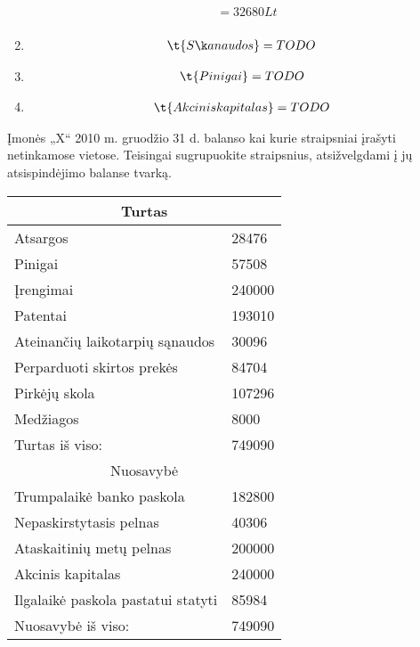 \begin{tasks}
\begin{task}
\begin{solution}
\begin{enumerate}
\begin{align*}
            &= 32680 Lt \\
          \end{align*}
        \item
          \begin{align*}
            \t{Sąnaudos}
            &= TODO \\
          \end{align*}
        \item
          \begin{align*}
            \t{Pinigai}
            &= TODO \\
          \end{align*}
        \item
          \begin{align*}
            \t{Akcinis kapitalas}
            &= TODO \\
          \end{align*}
      \end{enumerate}
    \end{solution}
  \end{task}

  \begin{task}
    \begin{condition}
      Įmonės „X“ 2010 m. gruodžio 31 d. balanso kai kurie straipsniai
      įrašyti netinkamose vietose. Teisingai sugrupuokite straipsnius,
      atsižvelgdami į jų atsispindėjimo balanse tvarką.
    \end{condition}
    \begin{solution}
      \begin{tabularx}{\tablewidth}[]{l | X}
        \multicolumn{2}{c}{Turtas} \\
        \hline
        Atsargos & 28476 \\
        Pinigai & 57508 \\
        Įrengimai & 240000 \\
        Patentai & 193010 \\
        Ateinančių laikotarpių sąnaudos & 30096 \\
        Perparduoti skirtos prekės & 84704 \\
        Pirkėjų skola & 107296 \\
        Medžiagos & 8000 \\
        \hline
        Turtas iš viso: & 749090 \\
        \multicolumn{2}{c}{Nuosavybė} \\
        \hline
        Trumpalaikė banko paskola & 182800 \\
        Nepaskirstytasis pelnas & 40306 \\
        Ataskaitinių metų pelnas & 200000 \\
        Akcinis kapitalas & 240000 \\
        Ilgalaikė paskola pastatui statyti & 85984 \\
        \hline
        Nuosavybė iš viso: & 749090 \\
      \end{tabularx}
    \end{solution}
  \end{task}


\end{tasks}
